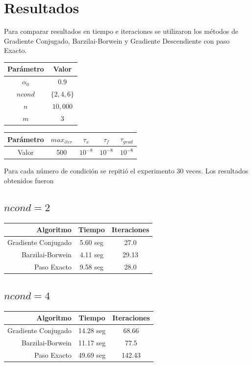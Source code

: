 \documentclass[11pt,letterpaper]{article}
\theoremstyle{definition}
\theoremstyle{definition}
\theoremstyle{definition}
\begin{document}
\section{Resultados}
Para comparar resultados en tiempo e iteraciones se utilizaron los métodos de Gradiente Conjugado,  Barzilai-Borwein y Gradiente Descendiente con paso Exacto.
\begin{center}
	\begin{tabular}{cc}
		\hline
		Parámetro & Valor \\
		\hline
		$\alpha_0 $ & 0.9 \\
		$ ncond $  & $ \{ 2, 4, 6 \} $ \\
		$ n $ & $ 10,000 $ \\
		$ m $ & $ 3 $ \\
		\hline
	\end{tabular}
\end{center}

\begin{center}
	\begin{tabular}{ccccc}
		\hline
		Parámetro & $ max_{iter} $ & $ \tau_x $ & $ \tau_f $ & $ \tau_{grad} $ \\
		\hline
		 Valor    &      500     & $ 10^{-8} $ & $ 10^{-8} $ & $ 10^{-8} $  \\
		\hline
	\end{tabular}
\end{center}
Para cada número de condición se repitió el experimento $ 30 $ veces. Los resultados obtenidos fueron

\subsection{$ ncond = 2 $}
\begin{center}
	\begin{tabular}{rcc}
	\hline
	\hline
	Algoritmo          & Tiempo       & Iteraciones \\
	\hline
	\hline
	Gradiente Conjugado & 5.60 seg &    27.0          \\
	Barzilai-Borwein    & 4.11 seg &    29.13          \\
	Paso Exacto         & 9.58 seg &    28.0          \\
	\hline
\end{tabular}
\end{center}


\subsection{$ ncond = 4 $}
\begin{center}
	\begin{tabular}{rcc}
		\hline
		\hline
		Algoritmo          & Tiempo       & Iteraciones \\
		\hline
		\hline
		Gradiente Conjugado & 14.28 seg & 68.66           \\
		Barzilai-Borwein    & 11.17 seg & 77.5            \\
		Paso Exacto         & 49.69 seg & 142.43          \\
		\hline
	\end{tabular}
\end{center}
\end{document}
